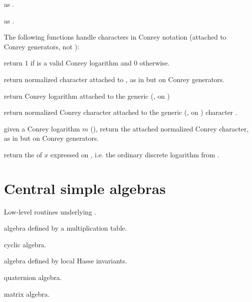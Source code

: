  as .

 as .

The following functions handle characters in Conrey notation (attached to
Conrey generators, not ):

 return $1$ if  is
a valid Conrey logarithm and $0$ otherwise.

 return normalized character
attached to , as in  but on Conrey generators.

 return Conrey logarithm
attached to the generic (, on )

 return normalized
Conrey character attached to the generic (, on )
character .

 given a Conrey logarithm $m$
(), return the attached normalized Conrey character, as in
 but on Conrey generators.

 return the  of $x$
expressed on , i.e. the ordinary discrete logarithm
from .

\section{Central simple algebras}


Low-level routines underlying .

algebra defined by a multiplication table.

cyclic algebra.

algebra defined by local Hasse invariants.

quaternion algebra.

matrix algebra.


